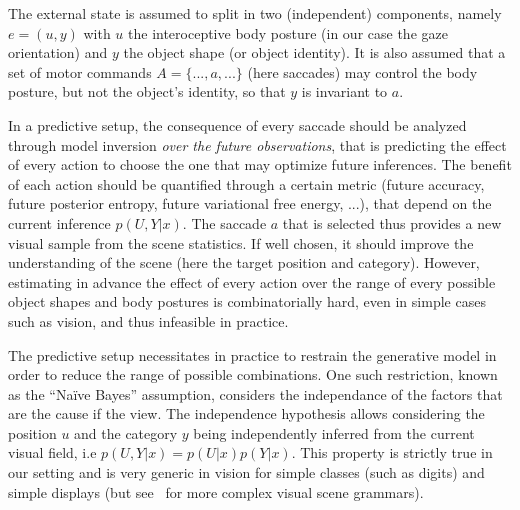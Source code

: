 The external state is assumed to split in two (independent) components, namely $e = (u,y)$ with $u$ the interoceptive body posture (in our case the gaze orientation) and $y$ the object shape (or object identity).
It is also assumed that a set of motor commands $A = \{..., a, ...\}$ (here saccades) may control the body posture, but not the object's identity, so that $y$ is invariant to $a$.

In a predictive setup, the consequence of every saccade should be analyzed through model inversion \emph{over the future observations}, that is predicting the effect of every action to choose the one that may optimize future inferences. The benefit of each action should be quantified through a certain metric (future accuracy, future posterior entropy, future variational free energy, ...), that depend on the current inference $p(U,Y|x)$. The saccade $a$ that is selected thus provides a new visual sample from the scene statistics. If well chosen, it should improve the understanding of the scene (here the target position and category). However, estimating in advance the effect of every action over the range of every possible object shapes and body postures is combinatorially hard, even in simple cases such as vision, and thus infeasible in practice.

The predictive setup necessitates in practice to restrain the generative model in order to reduce the range of possible combinations. One such restriction, known as the ``Naïve Bayes'' assumption, considers the independance of the factors that are the cause if the view.
The independence hypothesis allows considering the position $u$ and the category $y$ being independently inferred from the current visual field, i.e $p(U,Y|x) = p(U|x) p(Y|x)$. This property is strictly true in our setting and is very generic in vision for simple classes (such as digits) and simple displays (but see~\citep{Vo12} for more complex visual scene grammars). 

